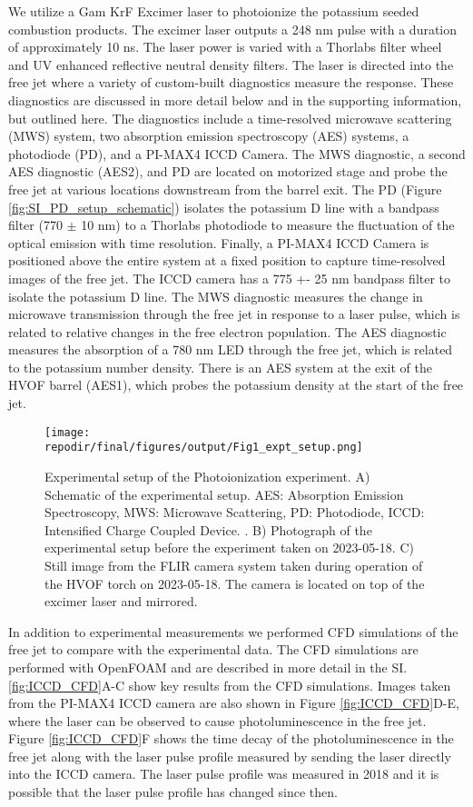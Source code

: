 We utilize a Gam KrF Excimer laser to photoionize the potassium seeded combustion products. The excimer laser outputs a 248 nm pulse with a duration of approximately 10 ns. The laser power is varied with a Thorlabs filter wheel and UV enhanced reflective neutral density filters. The laser is directed into the free jet where a variety of custom-built diagnostics measure the response. These diagnostics are discussed in more detail below and in the supporting information, but outlined here. The diagnostics include a time-resolved microwave scattering (MWS) system, two absorption emission spectroscopy (AES) systems, a photodiode (PD), and a PI-MAX4 ICCD Camera.  The MWS diagnostic, a second AES diagnostic (AES2), and PD are located on motorized stage and probe the free jet at various locations downstream from the barrel exit. The PD (Figure \ref*{fig:SI_PD_setup_schematic})  isolates the potassium D line with a bandpass filter (770 $\pm$ 10 nm) to a Thorlabs photodiode to measure the fluctuation of the optical emission with time resolution.  Finally, a PI-MAX4 ICCD Camera is positioned above the entire system at a fixed position to capture time-resolved images of the free jet. The ICCD camera has a 775 +- 25 nm bandpass filter to isolate the potassium D line. The MWS diagnostic measures the change in microwave transmission through the free jet in response to a laser pulse, which is related to relative changes in the free electron population. The AES diagnostic measures the absorption of a 780 nm LED through the free jet, which is related to the potassium number density. There is an AES system at the exit of the HVOF barrel (AES1), which probes the potassium density at the start of the free jet.

\begin{figure}[h]
    \texttt{[image: \\repodir/final/figures/output/Fig1\_expt\_setup.png]} 
    \caption{Experimental setup of the Photoionization experiment. A) Schematic of the experimental setup. AES: Absorption Emission Spectroscopy, MWS: Microwave Scattering, PD: Photodiode, ICCD: Intensified Charge Coupled Device.  . B) Photograph of the experimental setup before the experiment taken on 2023-05-18. C) Still image from the FLIR camera system taken during operation of the HVOF torch on 2023-05-18. The camera is located on top of the excimer laser and mirrored.  }
    \label{fig:expt_setup}
\end{figure}

In addition to experimental measurements we performed CFD simulations of the free jet to compare with the experimental data. The CFD simulations are performed with OpenFOAM and are described in more detail in the SI. \ref{fig:ICCD_CFD}A-C show key results from the CFD simulations. Images taken from the PI-MAX4 ICCD camera are also shown in Figure \ref{fig:ICCD_CFD}D-E, where the laser can be observed to cause photoluminescence in the free jet. Figure \ref{fig:ICCD_CFD}F shows the time decay of the photoluminescence in the free jet along with the laser pulse profile measured by sending the laser directly into the ICCD camera. The laser pulse profile was measured in 2018 and it is possible that the laser pulse profile has changed since then.


